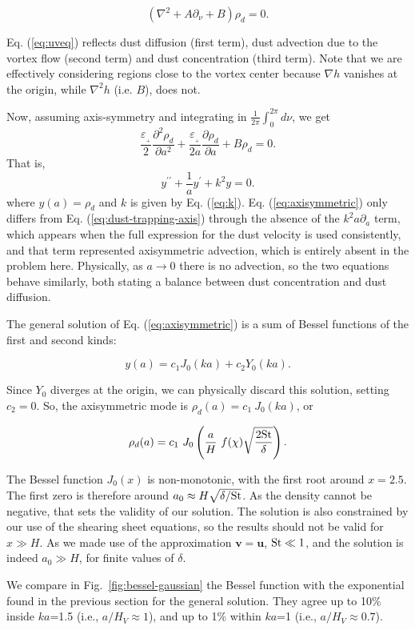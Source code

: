 \documentclass[apj]{emulateapj}
\newcommand{\pderiv}[2]{\frac{\partial #1}{\partial #2}}
\newcommand{\pderivn}[3]{\frac{\partial^{#3} #1}{\partial #2^{#3}}}
\renewcommand{\v}[1]{{\boldsymbol{#1}}} %
\newcommand{\Laplace}{\nabla^2}
\newcommand{\Eq}[1]{Eq. (\ref{#1})}
\newcommand{\eq}[1]{\Eq{#1}}
\newcommand{\Fig}[1]{Fig.~\ref{#1}}
\newcommand{\fig}[1]{\Fig{#1}}
\newcommand{\beq}{\begin{equation}}
\newcommand{\eeq}{\end{equation}}
\newcommand{\epsp}{\varepsilon_{_{+}}}
\newcommand{\St}{{\rm St}}
\begin{document}
\beq\label{eq:uveq}
\left(\Laplace{} + A\partial_\nu + B \right)\rho_d = 0. 
\eeq

\eq{eq:uveq} reflects dust diffusion (first term), dust advection due
to the vortex flow (second term) and dust concentration (third term). 
Note that we are effectively considering regions close to the vortex
center because $\nabla h$ vanishes at the origin, while $\nabla^2h$
(i.e. $B$), does not.   

Now, assuming axis-symmetry and integrating in
$\frac{1}{2\pi} \int_0^{2\pi} d\nu$, we get  
\beq
\frac{\epsp}{2}\pderivn{\rho_d}{a}{2} +
\frac{\epsp}{2a}\pderiv{\rho_d}{a} + B \rho_d = 0.  
\eeq
That is, 
\beq
y^{\prime\prime} + \frac{1}{a}y^\prime + k^2 y = 0. 
\label{eq:axisymmetric}
\eeq where $y(a) = \rho_d$ and $k$ is given by \eq{eq:k}. 
\eq{eq:axisymmetric} only differs from \eq{eq:dust-trapping-axis} through the
absence of the $k^2a\partial_a$ term, which appears when the full
expression for the dust velocity is used consistently, and that term represented
axisymmetric advection, which is entirely absent in the 
problem here. Physically, as $a\to0$ there is no advection, so the two
equations behave similarly, both stating a balance between dust
concentration and dust diffusion. 

The general solution of \eq{eq:axisymmetric} is a
sum of Bessel functions of the first and second kinds: 

\beq
y(a) = c_1 J_0 (ka) + c_2 Y_0(ka). 
\eeq

\noindent Since  $Y_0$ diverges at the origin, we can physically discard 
this solution, setting $c_2=0$. So, the axisymmetric mode is $\rho_d(a)
= c_1 \ J_0 (ka)$, or

\beq
\rho_d(a) = c_1 \ J_0 \left(\frac{a}{H} \ f(\chi) \sqrt{\frac{2\St}{\delta}}\right).
\eeq 

The Bessel function $J_0(x)$ is
non-monotonic, with the first root around $x=2.5$. The first zero is therefore around
$a_0 \approx H \sqrt{\delta/\St}$.  As the density
cannot be negative, that sets the validity of our solution. 
The solution is also constrained by our use of the shearing sheet
equations, so the results should not be valid for $x \gg H$.
As we made use of the approximation $\v{v}=\v{u}$, $\St \ll 1$,
and the solution  is indeed $a_0 \gg H$, for finite values of $\delta$.

We compare in \fig{fig:bessel-gaussian} the Bessel function with the exponential found in the
previous section for the general solution. They agree up to 10\% inside
$ka$=1.5 (i.e., $a/H_V\approx 1$), and up to 1\% within $ka$=1 (i.e.,
$a/H_V\approx 0.7$). 
\end{document}
